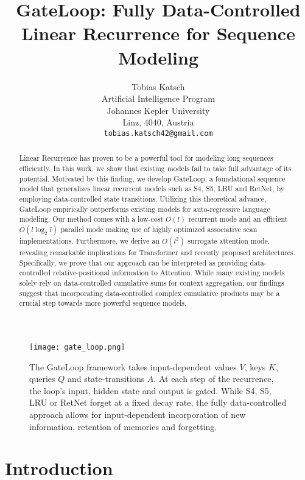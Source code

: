 \documentclass{article} \usepackage{iclr2024_conference,times}
\title{GateLoop: Fully Data-Controlled Linear Recurrence for Sequence Modeling}
\author{Tobias Katsch \\
Artificial Intelligence Program \\
Johannes Kepler University \\
Linz, 4040, Austria \\
\texttt{tobias.katsch42@gmail.com} \\
}
\begin{document}
\maketitle

\begin{abstract}
Linear Recurrence has proven to be a powerful tool for modeling long sequences efficiently. In this work, we show that existing models fail to take full advantage of its potential. Motivated by this finding, we develop GateLoop, a foundational sequence model that generalizes linear recurrent models such as S4, S5, LRU and RetNet, by employing data-controlled state transitions. 
Utilizing this theoretical advance, GateLoop empirically outperforms existing models for auto-regressive language modeling. Our method comes with a low-cost $O(l)$ recurrent mode and an efficient $O(l \log_{2} l)$ parallel mode making use of highly optimized associative scan implementations. Furthermore, we derive an $O(l^2)$ surrogate attention mode, revealing remarkable implications for Transformer and recently proposed architectures. 
Specifically, we prove that our approach can be interpreted as providing data-controlled relative-positional information to Attention. 
While many existing models solely rely on data-controlled cumulative sums for context aggregation, our findings suggest that incorporating data-controlled complex cumulative products may be a crucial step towards more powerful sequence models.
\end{abstract}

\begin{figure}[H]
\begin{center}
\texttt{[image: gate\_loop.png]}
\end{center}
\caption{The GateLoop framework takes input-dependent values $V$, keys $K$, queries $Q$ and state-transitions $A$. At each step of the recurrence, the loop's input, hidden state and output is gated. While S4, S5, LRU or RetNet forget at a fixed decay rate, the fully data-controlled approach allows for input-dependent incorporation of new information, retention of memories and forgetting. }

\end{figure}

\section{Introduction}
\end{document}
